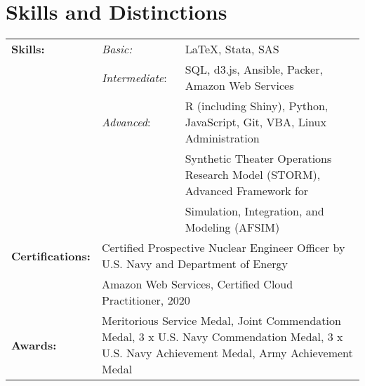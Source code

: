 \documentclass{article}
\begin{document}
\section{Skills and Distinctions}
\begin{tabular}{@{} l  l  l}
	\textbf{Skills:} 		& \textit{Basic:} 			& \LaTeX, Stata, SAS \\
							& \textit{Intermediate}: 	& SQL, d3.js, Ansible, Packer, Amazon Web Services\\
							& \textit{Advanced}:		& R (including Shiny), Python, JavaScript, Git, VBA, Linux Administration \\
							&                           & Synthetic Theater Operations Research Model (STORM), Advanced Framework for \\
							&                           & Simulation, Integration, and Modeling (AFSIM) \\
	\textbf{Certifications:} 	& \multicolumn{2}{p{16.5cm}}{\textendash Certified Prospective Nuclear Engineer Officer by U.S. Navy and Department of Energy} \\
	                          & \multicolumn{2}{p{16.5cm}}{\textendash Amazon Web Services, Certified Cloud Practitioner, 2020} \\
	\textbf{Awards:}			& \multicolumn{2}{p{16.5cm}}{Meritorious Service Medal, Joint Commendation Medal, 3 x U.S. Navy Commendation Medal, 3 x U.S. Navy Achievement Medal, Army Achievement Medal} \\
	
\end{tabular}
\end{document}
